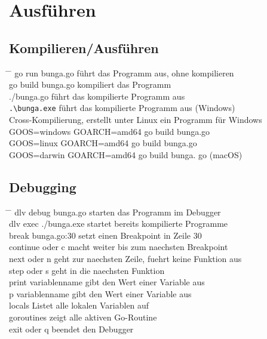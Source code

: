 \documentclass[twoside,a4paper,12pt]{article}
\begin{document}
\newpage
\section{Ausführen}
\subsection{Kompilieren/Ausführen}
\begin{tabbing}
  \hspace{2mm} \= \hspace{50mm} \= \kill
  \> go run bunga.go \> führt das Programm aus, ohne kompilieren \\ 
  \> go build bunga.go \> kompiliert das Programm \\ 
  \> ./bunga.go \> führt das kompilierte Programm aus \\ 
  \> \verb|.\bunga.exe| \> führt das kompilierte Programm aus (Windows) \\
  \> Cross-Kompilierung, erstellt unter Linux ein Programm für Windows \\
  \> GOOS=windows GOARCH=amd64 go build bunga.go \\
  \> GOOS=linux GOARCH=amd64 go build bunga.go \\ 
  \> GOOS=darwin GOARCH=amd64 go build bunga. go (macOS)\\
\end{tabbing}

\subsection{Debugging}
\begin{tabbing}
  \hspace{2mm} \= \hspace{50mm} \= \kill
  \> dlv debug bunga.go \> starten das Programm im Debugger \\
  \> dlv exec ./bunga.exe \> startet bereits kompilierte Programme \\ 
  \> break bunga.go:30 \> setzt einen Breakpoint in Zeile 30 \\ 
  \> continue oder c \> macht weiter bis zum naechsten Breakpoint \\ 
  \> next oder n \> geht zur naechsten Zeile, fuehrt keine Funktion aus \\ 
  \> step oder s \> geht in die naechsten Funktion \\ 
  \> print variablenname \> gibt den Wert einer Variable aus \\ 
  \> p variablenname \> gibt den Wert einer Variable aus \\ 
  \> locals \> Listet alle lokalen Variablen auf \\ 
  \> goroutines \> zeigt alle aktiven Go-Routine \\ 
  \> exit oder q \> beendet den Debugger \\
\end{tabbing}
\end{document}
